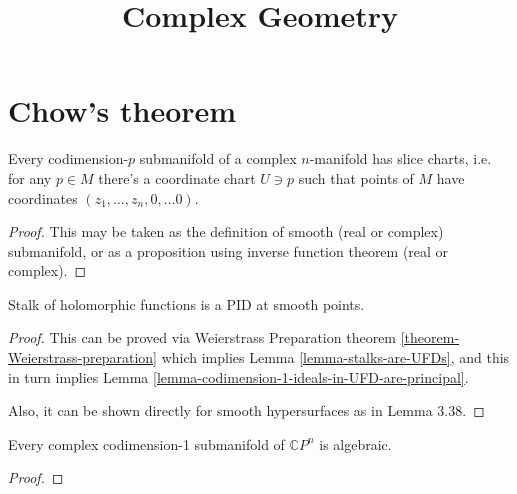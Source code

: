 



\title{Complex Geometry}
\maketitle

\label{section-phantom}

\tableofcontents


\section{Chow's theorem}
\label{section-chow-theorem}

\begin{proposition}
\label{proposition-slice-charts}
Every codimension-$p$ submanifold of a complex $n$-manifold has slice charts,
i.e. for any $p \in M$ there's a coordinate chart $U \ni p$ such that points of
$M$ have coordinates $(z_1,\ldots,z_n,0,\ldots 0)$.
\end{proposition}

\begin{proof}
This may be taken as the definition of smooth (real or complex) submanifold, or
as a proposition using inverse function theorem (real or complex).
\end{proof}

\begin{proposition}
\label{proposition-stalk-principal-smooth}
Stalk of holomorphic functions is a PID at smooth points.
\end{proposition}

\begin{proof}
This can be proved via Weierstrass Preparation theorem
\ref{theorem-Weierstrass-preparation} which implies
 Lemma \ref{lemma-stalks-are-UFDs}, and this in turn implies Lemma 
\ref{lemma-codimension-1-ideals-in-UFD-are-principal}.

Also, it can be shown directly for smooth hypersurfaces
 as in \cite{lec} Lemma 3.38.
\end{proof}

\begin{theorem}
\label{theorem-chow}
Every complex codimension-1 submanifold of $\mathbb{C}P^{n}$ is algebraic.
\end{theorem}

\begin{proof}

\end{proof}

